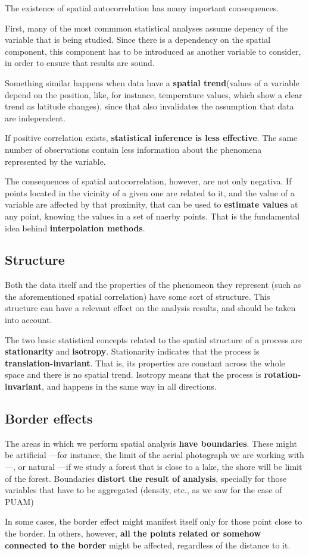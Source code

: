 The existence of spatial autocorrelation has many important consequences.

First, many of the most commmon statistical analyses assume depency of the variable that is being studied. Since there is a dependency on the spatial component, this component has to be introduced as another variable to consider, in order to ensure that results are sound.


Something similar happens when data have a \textbf{spatial trend}(values of a variable depend on the position, like, for instance, temperature values, which show a clear trend as latitude changes), since that also invalidates the assumption that data are independent.

If positive correlation exists, \textbf{statistical inference is less effective}. The same number of observations contain less information about the phenomena represented by the variable.

The consequences of spatial autocorrelation, however, are not only negativa. If points located in the vicinity of a given one are related to it, and the value of a variable are affected by that proximity, that can be used to \textbf{estimate values} at any point, knowing the values in a set of naerby points. That is the fundamental idea behind \textbf{interpolation methods}.


\subsection{Structure}

Both the data itself and the properties of the phenomeon they represent (such as the aforementioned spatial correlation) have some sort of structure. This structure can have a relevant effect on the analysis results, and should be taken into account.

The two basic statistical concepts related to the spatial structure of a process are \textbf{stationarity} and \textbf{isotropy}. Stationarity indicates that the process is \textbf{translation-invariant}. That is, its properties are constant across the whole space and there is no spatial trend. Isotropy means that the process is \textbf{rotation-invariant}, and happens in the same way in all directions.

\subsection{Border effects}

The areas in which we perform spatial analysis \textbf{have boundaries}. These might be artificial ---for instance, the limit of the aerial photograph we are working with---, or natural ---if we study a forest that is close to a lake, the shore will be limit of the forest. Boundaries \textbf{distort the result of analysis}, specially for those variables that have to be aggregated (density, etc., as we saw for the case of PUAM)

In some cases, the border effect might manifest itself only for those point close to the border. In others, however, \textbf{all the points related or somehow connected to the border} might be affected, regardless of the distance to it.

\pagestyle{empty}